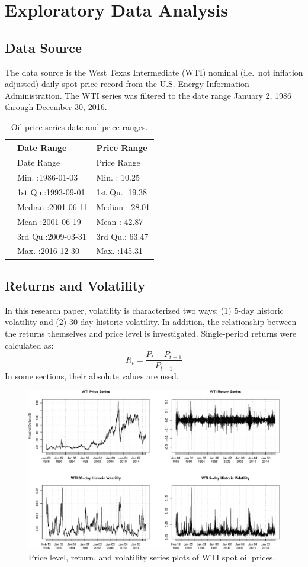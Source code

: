 \documentclass[11pt,]{article}
\begin{document}
\section{Exploratory Data Analysis}\label{exploratory-data-analysis}

\subsection{Data Source}\label{data-source}

The data source is the West Texas Intermediate (WTI) nominal (i.e.~not
inflation adjusted) daily spot price record from the U.S. Energy
Information Administration. The WTI series was filtered to the date
range January 2, 1986 through December 30, 2016.

\begin{longtable}[]{@{}lll@{}}
\caption{Oil price series date and price ranges.}\tabularnewline
\toprule
& Date Range & Price Range\tabularnewline
\midrule
\endfirsthead
\toprule
& Date Range & Price Range\tabularnewline
\midrule
\endhead
& Min. :1986-01-03 & Min. : 10.25\tabularnewline
& 1st Qu.:1993-09-01 & 1st Qu.: 19.38\tabularnewline
& Median :2001-06-11 & Median : 28.01\tabularnewline
& Mean :2001-06-19 & Mean : 42.87\tabularnewline
& 3rd Qu.:2009-03-31 & 3rd Qu.: 63.47\tabularnewline
& Max. :2016-12-30 & Max. :145.31\tabularnewline
\bottomrule
\end{longtable}

\subsection{Returns and Volatility}\label{returns-and-volatility}

In this research paper, volatility is characterized two ways: (1) 5-day
historic volatility and (2) 30-day historic volatility. In addition, the
relationship between the returns themselves and price level is
investigated. Single-period returns were calculated as:
\[R_t = \frac{P_t-P_{t-1}}{P_{t-1}}\] In some sections, their absolute
values are used.

\begin{figure}[htbp]
\centering
\includegraphics{Figs/unnamed-chunk-4-1.pdf}
\caption{Price level, return, and volatility series plots of WTI spot
oil prices.}
\end{figure}
\end{document}
